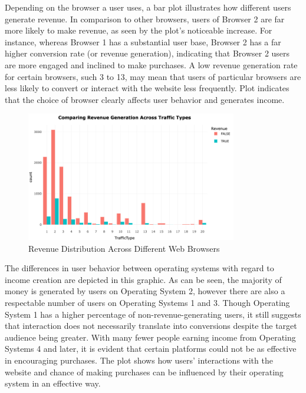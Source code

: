 \documentclass[12pt]{article}
\begin{document}
Depending on the browser a user uses, a bar plot illustrates how different users generate revenue. In comparison to other browsers, users of Browser 2 are far more likely to make revenue, as seen by the plot's noticeable increase. For instance, whereas Browser 1 has a substantial user base, Browser 2 has a far higher conversion rate (or revenue generation), indicating that Browser 2 users are more engaged and inclined to make purchases. A low revenue generation rate for certain browsers, such 3 to 13, may mean that users of particular browsers are less likely to convert or interact with the website less frequently. Plot indicates that the choice of browser clearly affects user behavior and generates income.
\begin{figure}[h]
    \centering
    \includegraphics[width=0.82\textwidth]{Revenue Generation Across Browsers.png}  
    \caption{Revenue Distribution Across Different Web Browsers}
\end{figure}

\FloatBarrier
The differences in user behavior between operating systems with regard to income creation are depicted in this graphic. As can be seen, the majority of money is generated by users on Operating System 2, however there are also a respectable number of users on Operating Systems 1 and 3. Though Operating System 1 has a higher percentage of non-revenue-generating users, it still suggests that interaction does not necessarily translate into conversions despite the target audience being greater. With many fewer people earning income from Operating Systems 4 and later, it is evident that certain platforms could not be as effective in encouraging purchases. The plot shows how users' interactions with the website and chance of making purchases can be influenced by their operating system in an effective way.
\end{document}
